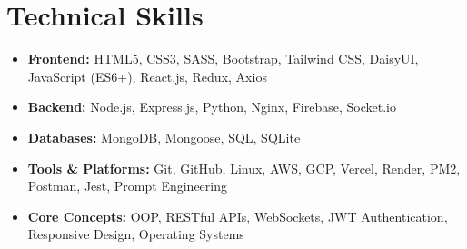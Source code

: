 \documentclass[11pt, a4paper]{article}
\begin{document}
\vspace{-9pt}

\section{Technical Skills}
\vspace{1pt}
\begin{itemize}[leftmargin=0.15in, itemsep=0pt, parsep=0pt]
  \item \small\textbf{Frontend:} HTML5, CSS3, SASS, Bootstrap, Tailwind CSS, DaisyUI, JavaScript (ES6+), React.js, Redux, Axios
  \item \small\textbf{Backend:} Node.js, Express.js, Python, Nginx, Firebase, Socket.io
  \item \small\textbf{Databases:} MongoDB, Mongoose, SQL, SQLite
  \item \small\textbf{Tools \& Platforms:} Git, GitHub, Linux, AWS, GCP, Vercel, Render, PM2, Postman, Jest, Prompt Engineering
  \item \small\textbf{Core Concepts:} OOP, RESTful APIs, WebSockets, JWT Authentication, Responsive Design, Operating Systems
\end{itemize}
\end{document}
